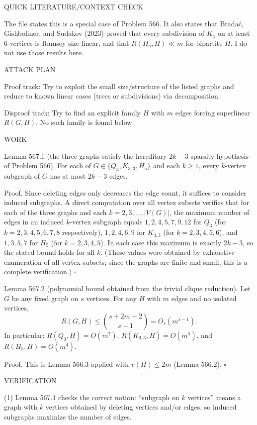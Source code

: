 QUICK LITERATURE/CONTEXT CHECK

The file states this is a special case of Problem 566.
It also states that Brada\'c, Gishboliner, and Sudakov (2023) proved that every subdivision of $K_4$ on at least $6$ vertices is Ramsey size linear, and that $R(H_5,H)\ll m$ for bipartite $H$.
I do not use those results here.

ATTACK PLAN

Proof track:
Try to exploit the small size/structure of the listed graphs and reduce to known linear cases (trees or subdivisions) via decomposition.

Disproof track:
Try to find an explicit family $H$ with $m$ edges forcing superlinear $R(G,H)$.
No such family is found below.

WORK

Lemma 567.1 (the three graphs satisfy the hereditary $2k-3$ sparsity hypothesis of Problem 566).
For each of $G\in\{Q_3,K_{3,3},H_5\}$ and each $k\ge 1$, every $k$-vertex subgraph of $G$ has at most $2k-3$ edges.

Proof.
Since deleting edges only decreases the edge count, it suffices to consider induced subgraphs.
A direct computation over all vertex subsets verifies that for each of the three graphs and each $k=2,3,\dots,|V(G)|$,
the maximum number of edges in an induced $k$-vertex subgraph equals $1,2,4,5,7,9,12$ for $Q_3$ (for $k=2,3,4,5,6,7,8$ respectively),
$1,2,4,6,9$ for $K_{3,3}$ (for $k=2,3,4,5,6$),
and $1,3,5,7$ for $H_5$ (for $k=2,3,4,5$).
In each case this maximum is exactly $2k-3$, so the stated bound holds for all $k$.
(These values were obtained by exhaustive enumeration of all vertex subsets; since the graphs are finite and small, this is a complete verification.) \hfill$\square$

Lemma 567.2 (polynomial bound obtained from the trivial clique reduction).
Let $G$ be any fixed graph on $s$ vertices. For any $H$ with $m$ edges and no isolated vertices,
\[
R(G,H) \le \binom{s+2m-2}{s-1} = O_s(m^{s-1}).
\]
In particular:
$R(Q_3,H)=O(m^7)$, $R(K_{3,3},H)=O(m^5)$, and $R(H_5,H)=O(m^4)$.

Proof.
This is Lemma 566.3 applied with $v(H)\le 2m$ (Lemma 566.2). \hfill$\square$

VERIFICATION

(1) Lemma 567.1 checks the correct notion: ``subgraph on $k$ vertices'' means a graph with $k$ vertices obtained by deleting vertices and/or edges, so induced subgraphs maximize the number of edges.

